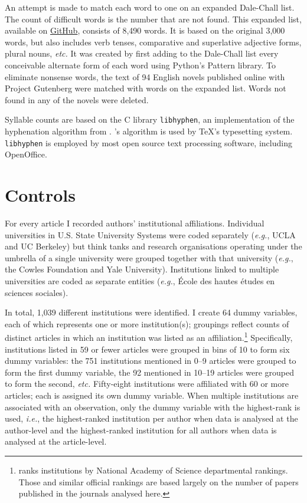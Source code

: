 \begin{appendices}
An attempt is made to match each word to one on an expanded Dale-Chall list. The count of difficult words is the number that are not found. This expanded list, available on \href{https://github.com/erinhengel/Textatistic}{GitHub}, consists of 8,490 words. It is based on the original 3,000 words, but also includes verb tenses, comparative and superlative adjective forms, plural nouns, \emph{etc.} It was created by first adding to the Dale-Chall list every conceivable alternate form of each word using Python's Pattern library. To eliminate nonsense words, the text of 94 English novels published online with Project Gutenberg were matched with words on the expanded list. Words not found in any of the novels were deleted.

Syllable counts are based on the C library \texttt{libhyphen}, an implementation of the hyphenation algorithm from \citet{Liang1983}.  \citet{Liang1983}'s algorithm is used by \TeX's typesetting system. \texttt{libhyphen} is employed by most open source text processing software, including OpenOffice.

\section{Controls}
\label{appendixcontrols}

For every article I recorded authors' institutional affiliations. Individual universities in U.S. State University Systems were coded separately (\emph{e.g.}, UCLA and UC Berkeley) but think tanks and research organisations operating under the umbrella of a single university were grouped together with that university (\emph{e.g.}, the Cowles Foundation and Yale University). Institutions linked to multiple universities are coded as separate entities (\emph{e.g.}, École des hautes études en sciences sociales).

In total, 1,039 different institutions were identified. I create 64 dummy variables, each of which represents one or more institution(s); groupings reflect counts of distinct articles in which an institution was listed as an affiliation.\footnote{\citet{Blank1991} ranks institutions by National Academy of Science departmental rankings. Those and similar official rankings are based largely on the number of papers published in the journals analysed here.} Specifically, institutions listed in 59 or fewer articles were grouped in bins of 10 to form six dummy variables: the 751 institutions mentioned in 0--9 articles were grouped to form the first dummy variable, the 92 mentioned in 10--19 articles were grouped to form the second, \emph{etc.} Fifty-eight institutions were affiliated with 60 or more articles; each is assigned its own dummy variable. When multiple institutions are associated with an observation, only the dummy variable with the highest-rank is used, \emph{i.e.}, the highest-ranked institution per author when data is analysed at the author-level and the highest-ranked institution for all authors when data is analysed at the article-level.


\end{appendices}
